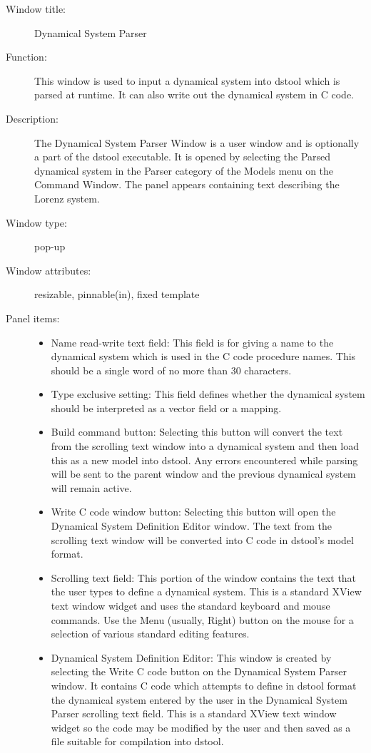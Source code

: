 %
%
%
\begin{description}

\item[Window title:] Dynamical System Parser

\item[Function:] This window is used to input a dynamical
	system into dstool which is parsed at runtime.  It can
	also write out the dynamical system in C code.
	
\item[Description:] The Dynamical System Parser Window is a user window
	and is optionally a part of the dstool executable.  It is opened
	by selecting the Parsed dynamical system in the Parser category
	of the Models menu on the Command Window.  The panel appears containing
	text describing the Lorenz system.

\item[Window type:] pop-up    

\item[Window attributes:] resizable, pinnable(in), fixed template

\item[Panel items:]\mbox{}
    \begin{itemize}
	\item Name read-write text field: This field is for giving a name
		to the dynamical system which is used in the C code procedure
		names.  This should be a single word of no more than 30 characters.
	\item Type exclusive setting: This field defines whether the dynamical
		system should be interpreted as a vector field or a mapping.
	\item Build command button: Selecting this button will convert the
		text from the scrolling text window into a dynamical
		system and then load this as a new model into dstool.
		Any errors encountered while parsing will be sent to the
		parent window and the previous dynamical system will remain active.
	\item Write C code window button: Selecting this button will open
		the Dynamical System Definition Editor window.  The text from 
		the scrolling text window will be converted into C code in
		dstool's model format.
	\item Scrolling text field: This portion of the window contains the text that
		the user types to define a dynamical system.  This
		is a standard XView text window widget and uses the 
		standard keyboard and mouse commands.  Use the Menu (usually, Right) 
		button on the mouse for a selection of various standard editing features.
	\item Dynamical System Definition Editor: This window is created by selecting
		the Write C code button on the Dynamical System Parser window.  It
		contains C code which attempts to define in dstool format the dynamical system
		entered by the user in the Dynamical System Parser scrolling text field.
		This is a standard XView text window widget so the code may be modified
		by the user and then saved as a file suitable for compilation into dstool.
    \end{itemize}


\end{description}
